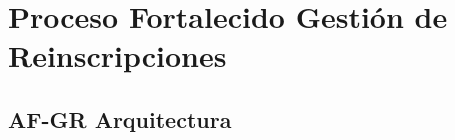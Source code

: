 \chapter{Proceso Fortalecido Gestión de Reinscripciones}
\hypertarget{chapter:PFGR}{}
\section{AF-GR Arquitectura}
%	


